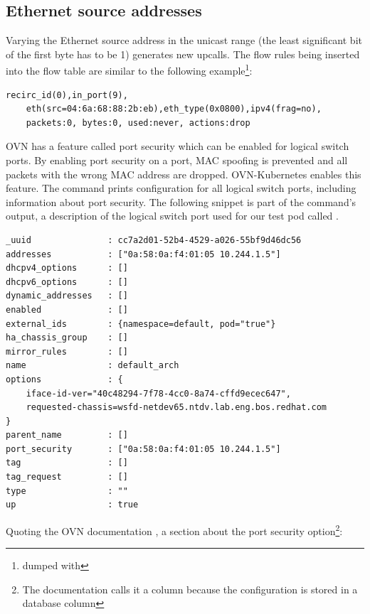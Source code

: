 \subsection{Ethernet source addresses}
\label{subsec:ethernet}

Varying the Ethernet source address in the unicast range (the least significant bit of the first byte has to be 1) generates new upcalls. The flow rules being inserted into the flow table are similar to the following example\footnote{dumped with }:

\begin{verbatim}
recirc_id(0),in_port(9),
    eth(src=04:6a:68:88:2b:eb),eth_type(0x0800),ipv4(frag=no),
    packets:0, bytes:0, used:never, actions:drop
\end{verbatim}

OVN has a feature called port security which can be enabled for logical switch ports. By enabling port security on a port, MAC spoofing is prevented and all packets with the wrong MAC address are dropped. OVN-Kubernetes enables this feature. The command  prints configuration for all logical switch ports, including information about port security. The following snippet is part of the command's output, a description of the logical switch port used for our test pod called .

\begin{verbatim}
_uuid               : cc7a2d01-52b4-4529-a026-55bf9d46dc56
addresses           : ["0a:58:0a:f4:01:05 10.244.1.5"]
dhcpv4_options      : []
dhcpv6_options      : []
dynamic_addresses   : []
enabled             : []
external_ids        : {namespace=default, pod="true"}
ha_chassis_group    : []
mirror_rules        : []
name                : default_arch
options             : {
    iface-id-ver="40c48294-7f78-4cc0-8a74-cffd9ecec647",
    requested-chassis=wsfd-netdev65.ntdv.lab.eng.bos.redhat.com
}
parent_name         : []
port_security       : ["0a:58:0a:f4:01:05 10.244.1.5"]
tag                 : []
tag_request         : []
type                : ""
up                  : true
\end{verbatim}

Quoting the OVN documentation \cite{OVNNBMan}, a section about the port security option\footnote{The documentation calls it a column because the configuration is stored in a database column}:

